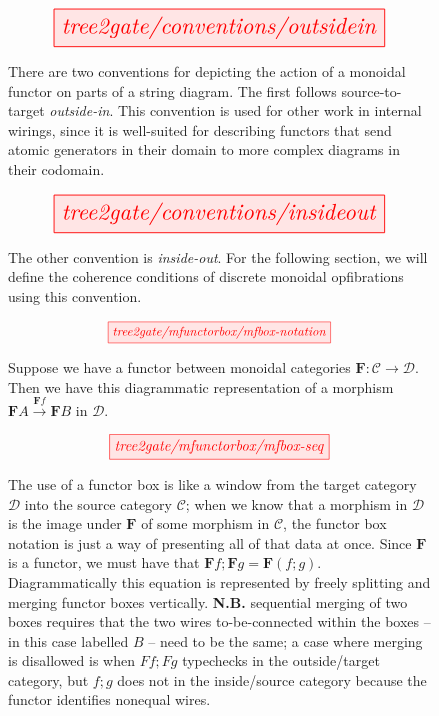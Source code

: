 \begin{figure}[h!]\label{fig:outsidein}
\centering
\[\resizebox{0.75\textwidth}{!}{\tikzfig{tree2gate/conventions/outsidein}}\]
\caption{There are two conventions for depicting the action of a monoidal functor on parts of a string diagram. The first follows source-to-target \emph{outside-in}. This convention is used for other work in internal wirings, since it is well-suited for describing functors that send atomic generators in their domain to more complex diagrams in their codomain.}
\end{figure}

\begin{figure}[h!]\label{fig:insideout}
\centering
\[\resizebox{0.75\textwidth}{!}{\tikzfig{tree2gate/conventions/insideout}}\]
\caption{The other convention is \emph{inside-out}. For the following section, we will define the coherence conditions of discrete monoidal opfibrations using this convention.}
\end{figure}

\begin{figure}[h!]
\[\resizebox{0.5\textwidth}{!}{\tikzfig{tree2gate/mfunctorbox/mfbox-notation}}\]
\caption{Suppose we have a functor between monoidal categories $\mathbf{F}: \mathcal{C} \rightarrow \mathcal{D}$. Then we have this diagrammatic representation of a morphism $\mathbf{F}A \overset{\mathbf{F}f}{\rightarrow} \mathbf{F}B$ in $\mathcal{D}$.}
\end{figure}

\begin{figure}[h!]
\[\resizebox{0.5\textwidth}{!}{\tikzfig{tree2gate/mfunctorbox/mfbox-seq}}\]
\caption{The use of a functor box is like a window from the target category $\mathcal{D}$ into the source category $\mathcal{C}$; when we know that a morphism in $\mathcal{D}$ is the image under $\mathbf{F}$ of some morphism in $\mathcal{C}$, the functor box notation is just a way of presenting all of that data at once. Since $\mathbf{F}$ is a functor, we must have that $\mathbf{F}f ; \mathbf{F}g = \mathbf{F}(f;g)$. Diagrammatically this equation is represented by freely splitting and merging functor boxes vertically. \textbf{N.B.} sequential merging of two boxes requires that the two wires to-be-connected within the boxes -- in this case labelled $B$ -- need to be the same; a case where merging is disallowed is when $Ff;Fg$ typechecks in the outside/target category, but $f;g$ does not in the inside/source category because the functor identifies nonequal wires.}
\end{figure}


